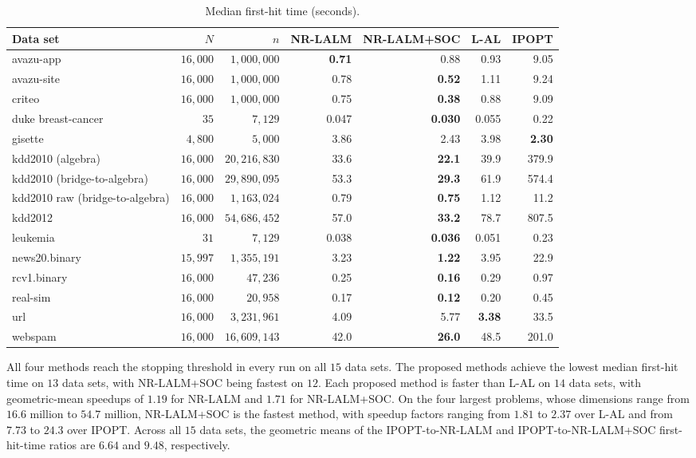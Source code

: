 \documentclass[11pt]{article}
\theoremstyle{definition}
\theoremstyle{remark}
\numberwithin{equation}{section}
\numberwithin{figure}{section}
\numberwithin{table}{section}
\numberwithin{algorithm}{section}
\begin{document}
\begin{table}[!t]
\centering
\caption{Median first-hit time (seconds).}
\label{tab:libsvm-stage-b-timing}
\scriptsize
\setlength{\tabcolsep}{2.8pt}
\renewcommand{\arraystretch}{0.88}
\begin{tabular}{@{}lrrrrrr@{}}
\toprule
Data set & $N$ & $n$ & NR-LALM & NR-LALM+SOC & L-AL & IPOPT \\
\midrule
avazu-app
& $16{,}000$ & $1{,}000{,}000$
& \textbf{0.71} & 0.88 & 0.93 & 9.05 \\
avazu-site
& $16{,}000$ & $1{,}000{,}000$
& 0.78 & \textbf{0.52} & 1.11 & 9.24 \\
criteo
& $16{,}000$ & $1{,}000{,}000$
& 0.75 & \textbf{0.38} & 0.88 & 9.09 \\
duke breast-cancer
& $35$ & $7{,}129$
& 0.047 & \textbf{0.030} & 0.055 & 0.22 \\
gisette
& $4{,}800$ & $5{,}000$
& 3.86 & 2.43 & 3.98 & \textbf{2.30} \\
kdd2010 (algebra)
& $16{,}000$ & $20{,}216{,}830$
& 33.6 & \textbf{22.1} & 39.9 & 379.9 \\
kdd2010 (bridge-to-algebra)
& $16{,}000$ & $29{,}890{,}095$
& 53.3 & \textbf{29.3} & 61.9 & 574.4 \\
kdd2010 raw (bridge-to-algebra)
& $16{,}000$ & $1{,}163{,}024$
& 0.79 & \textbf{0.75} & 1.12 & 11.2 \\
kdd2012
& $16{,}000$ & $54{,}686{,}452$
& 57.0 & \textbf{33.2} & 78.7 & 807.5 \\
leukemia
& $31$ & $7{,}129$
& 0.038 & \textbf{0.036} & 0.051 & 0.23 \\
news20.binary
& $15{,}997$ & $1{,}355{,}191$
& 3.23 & \textbf{1.22} & 3.95 & 22.9 \\
rcv1.binary
& $16{,}000$ & $47{,}236$
& 0.25 & \textbf{0.16} & 0.29 & 0.97 \\
real-sim
& $16{,}000$ & $20{,}958$
& 0.17 & \textbf{0.12} & 0.20 & 0.45 \\
url
& $16{,}000$ & $3{,}231{,}961$
& 4.09 & 5.77 & \textbf{3.38} & 33.5 \\
webspam
& $16{,}000$ & $16{,}609{,}143$
& 42.0 & \textbf{26.0} & 48.5 & 201.0 \\
\bottomrule
\end{tabular}
\end{table}

All four methods reach the stopping threshold in every run on all $15$ data sets.  The proposed methods achieve the lowest median first-hit time on $13$ data sets, with NR-LALM+SOC being fastest on $12$.  Each proposed method is faster than L-AL on $14$ data sets, with geometric-mean speedups of $1.19$ for NR-LALM and $1.71$ for NR-LALM+SOC.  On the four largest problems, whose dimensions range from $16.6$ million to $54.7$ million, NR-LALM+SOC is the fastest method, with speedup factors ranging from $1.81$ to $2.37$ over L-AL and from $7.73$ to $24.3$ over IPOPT.  Across all $15$ data sets, the geometric means of the IPOPT-to-NR-LALM and IPOPT-to-NR-LALM+SOC first-hit-time ratios are $6.64$ and $9.48$, respectively.
\end{document}
